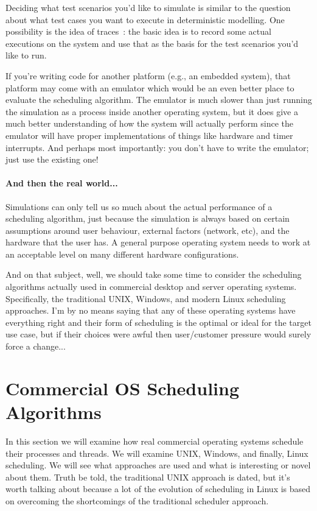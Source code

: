 Deciding what test scenarios you'd like to simulate is similar to the question about what test cases you want to execute in deterministic modelling. One possibility is the idea of traces~\cite{osc}: the basic idea is to record some actual executions on the system and use that as the basis for the test scenarios you'd like to run.

If you're writing code for another platform (e.g., an embedded system), that platform may come with an emulator which would be an even better place to evaluate the scheduling algorithm. The emulator is much slower than just running the simulation as a process inside another operating system, but it does give a much better understanding of how the system will actually perform since the emulator will have proper implementations of things like hardware and timer interrupts. And perhaps most importantly: you don't have to write the emulator; just use the existing one!

\paragraph{And then the real world...}
Simulations can only tell us so much about the actual performance of a scheduling algorithm, just because the simulation is always based on certain assumptions around user behaviour, external factors (network, etc), and the hardware that the user has. A general purpose operating system needs to work at an acceptable level on many different hardware configurations. 

And on that subject, well, we should take some time to consider the scheduling algorithms actually used in commercial desktop and server operating systems. Specifically, the traditional UNIX, Windows, and modern Linux scheduling approaches. I'm by no means saying that any of these operating systems have everything right and their form of scheduling is the optimal or ideal for the target use case, but if their choices were awful then user/customer pressure would surely force a change...

\section*{Commercial OS Scheduling Algorithms}

In this section we will examine how real commercial operating systems schedule their processes and threads. We will examine UNIX, Windows, and finally, Linux scheduling. We will see what approaches are used and what is interesting or novel about them. Truth be told, the traditional UNIX approach is dated, but it's worth talking about because a lot of the evolution of scheduling in Linux is based on overcoming the shortcomings of the traditional scheduler approach.

